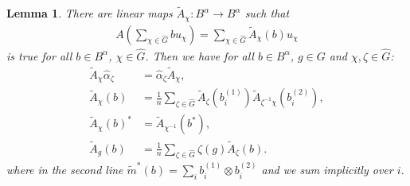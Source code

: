 \documentclass{amsart}
\newtheorem{lemma}[thm]{Lemma}
\theoremstyle{definition}
\theoremstyle{definition}
\begin{document}
\begin{lemma}
    \label{lemma:technical_properties_of_Ag_Xg}
    There are linear maps $\tilde{A}_\chi: B^\alpha \to B^\alpha$ such that
    \begin{align}
        \label{eq:definition_of_tildeA_chi}
        A\left( \sum_{\chi \in \hat{G}} b u_\chi \right) 
            = \sum_{\chi \in \hat{G}} \tilde{A}_\chi(b) u_\chi
    \end{align}
    is true for all $b \in B^\alpha$, $\chi \in \hat{G}$.
    Then we have for all $b \in B^\alpha$, $g \in G$ and $\chi, \zeta \in \hat{G}$:
    \begin{align}
        \tilde{A}_\chi \hat{\alpha}_\zeta
            &= \hat{\alpha}_\zeta \tilde{A}_\chi,
            \label{eq:Ag_commutes_with_hatalpha} \\
        \tilde{A}_\chi(b)
            &= \frac{1}{n} \sum_{\zeta \in \hat{G}} \tilde{A}_\zeta\left(b_i^{(1)}\right) \tilde{A}_{\zeta^{-1} \chi}\left(b_i^{(2)}\right),
            \label{eq:convolution_formula_for_A_chi} \\
        \tilde{A}_\chi(b)^\ast
            &= \tilde{A}_{\chi^{-1}}(b^\ast),
            \label{eq:A_chi_and_the_star} \\
        \tilde{A}_g(b)
            &= \frac{1}{n} \sum_{\zeta \in \hat{G}} \zeta(g) \tilde{A}_\zeta(b).
            \label{eq:formula_for_tildeA}
    \end{align}
    where in the second line $\tilde{m}^\ast(b) = \sum_i b_i^{(1)} \otimes b_i^{(2)}$ and we sum implicitly over $i$.
\end{lemma}
\end{document}
